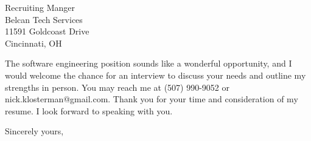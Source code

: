 \documentclass{letter} %
\begin{document}
\begin{letter}{Recruiting Manger \\
Belcan Tech Services \\
11591 Goldcoast Drive\\
Cincinnati, OH

}
\noindent 
The software engineering position sounds like a wonderful opportunity, and I would welcome the chance for an interview to discuss your needs and outline my strengths in person. 
You may reach me at (507) 990-9052 or nick.klosterman@gmail.com.
Thank you for your time and consideration of my resume. I look forward to speaking with you.
 

\closing{Sincerely yours,} 
 

 

\end{letter}
 
\end{document}
